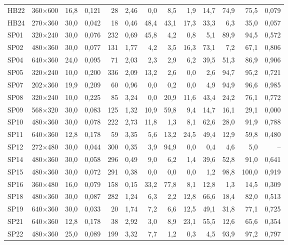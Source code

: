 \begin{table}[htbp]
\begin{tabular}{lllrrrrrrrrrr}
HB22 & 360$\times$600 & 16,8 & 0,121 & 28 & 2,46 & 0,0 & 8,5 & 1,9 & 14,7 & 74,9 & 75,5 & 0,079 \\
HB24 & 270$\times$360 & 30,0 & 0,042 & 18 & 0,46 & 48,4 & 43,1 & 17,3 & 33,3 & 6,3 & 35,0 & 0,057 \\
SP01 & 320$\times$240 & 30,0 & 0,076 & 232 & 0,69 & 45,8 & 4,2 & 0,8 & 5,1 & 89,9 & 94,5 & 0,572 \\
SP02 & 480$\times$360 & 30,0 & 0,077 & 131 & 1,77 & 4,2 & 3,5 & 16,3 & 73,1 & 7,2 & 67,1 & 0,806 \\
SP04 & 640$\times$360 & 24,0 & 0,095 & 71 & 2,03 & 2,3 & 2,9 & 6,2 & 39,5 & 51,3 & 86,9 & 0,906 \\
SP05 & 320$\times$240 & 10,0 & 0,200 & 336 & 2,09 & 13,2 & 2,6 & 0,0 & 2,6 & 94,7 & 95,2 & 0,721 \\
SP07 & 202$\times$360 & 19,9 & 0,209 & 60 & 0,96 & 0,0 & 0,2 & 0,0 & 4,9 & 94,9 & 96,6 & 0,985 \\
SP08 & 320$\times$240 & 10,0 & 0,225 & 85 & 3,24 & 0,0 & 20,9 & 11,6 & 43,4 & 24,2 & 76,1 & 0,772 \\
SP09 & 568$\times$320 & 30,0 & 0,083 & 125 & 1,32 & 10,9 & 59,8 & 9,4 & 14,7 & 16,1 & 29,1 & 0,000 \\
SP10 & 480$\times$360 & 30,0 & 0,078 & 222 & 2,73 & 11,8 & 1,3 & 8,1 & 62,6 & 28,0 & 91,9 & 0,788 \\
SP11 & 640$\times$360 & 12,8 & 0,178 & 59 & 3,35 & 5,6 & 13,2 & 24,5 & 49,4 & 12,9 & 59,8 & 0,480 \\
SP12 & 272$\times$480 & 30,0 & 0,044 & 300 & 0,35 & 3,9 & 94,9 & 0,0 & 0,4 & 4,6 & 5,0 & -- \\
SP14 & 480$\times$360 & 30,0 & 0,058 & 296 & 0,49 & 9,0 & 6,2 & 1,4 & 39,6 & 52,8 & 91,0 & 0,641 \\
SP15 & 480$\times$360 & 30,0 & 0,072 & 291 & 0,38 & 0,0 & 0,0 & 0,0 & 1,2 & 98,8 & 100,0 & 0,919 \\
SP16 & 360$\times$480 & 16,0 & 0,079 & 158 & 0,15 & 33,2 & 77,8 & 8,1 & 12,8 & 1,3 & 14,5 & 0,309 \\
SP18 & 480$\times$360 & 30,0 & 0,087 & 282 & 1,24 & 6,3 & 2,2 & 12,8 & 66,6 & 18,4 & 82,0 & 0,513 \\
SP19 & 640$\times$360 & 30,0 & 0,033 & 20 & 1,74 & 7,2 & 6,6 & 12,5 & 49,1 & 31,8 & 77,1 & 0,725 \\
SP21 & 640$\times$360 & 12,8 & 0,178 & 38 & 2,92 & 3,0 & 8,9 & 23,1 & 55,5 & 12,6 & 65,6 & 0,354 \\
SP22 & 480$\times$360 & 25,0 & 0,089 & 199 & 3,32 & 7,7 & 1,2 & 0,3 & 4,5 & 93,9 & 97,2 & 0,797 \\

\end{tabular}
\end{table}
